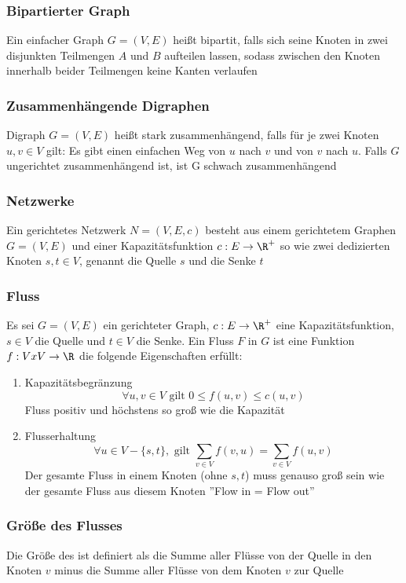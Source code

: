 \documentclass[a4paper]{article}
\begin{document}
	\subsubsection{Bipartierter Graph}
		Ein einfacher Graph $G=(V,E)$ heißt bipartit, falls sich seine Knoten in zwei disjunkten Teilmengen $A$ und $B$ aufteilen lassen, sodass zwischen den Knoten innerhalb beider Teilmengen keine Kanten verlaufen
	\subsubsection{Zusammenhängende Digraphen}
		Digraph $G=(V,E)$ heißt stark zusammenhängend, falls für je zwei Knoten $u,v\in V$ gilt: Es gibt einen einfachen Weg von $u$ nach $v$ und von $v$ nach $u$. Falls $G$ ungerichtet zusammenhängend ist, ist G schwach zusammenhängend
	\subsubsection{Netzwerke}
		Ein gerichtetes Netzwerk $N=(V,E,c)$ besteht aus einem gerichtetem Graphen $G=(V,E)$ und einer Kapazitätsfunktion $c:E\to \R^+$ so wie zwei dedizierten Knoten $s,t\in V$, genannt die Quelle $s$ und die Senke $t$
	\subsubsection{Fluss}
		Es sei $G=(V,E)$ ein gerichteter Graph, $c:E\to \R^+$ eine Kapazitätsfunktion, $s\in V$ die Quelle und $t\in V$ die Senke. Ein Fluss $F$ in $G$ ist eine Funktion $f:VxV\to \R$ die folgende Eigenschaften erfüllt:
			\begin{enumerate}
			  \item Kapazitätsbegränzung 
			  	$$
			  		\forall u,v\in V \text{ gilt } 0\leq f(u,v)\leq c(u,v)
			  	$$
			  	Fluss positiv und höchstens so groß wie die Kapazität
			  	\item Flusserhaltung
			  	$$
			  		\forall u\in V-\{s,t\}, \text{ gilt } \displaystyle\sum_{v \in V}f(v,u)=\displaystyle\sum_{v\in V}f(u,v)
			  	$$
			  	Der gesamte Fluss in einem Knoten (ohne $s,t$) muss genauso groß sein wie der gesamte Fluss aus diesem Knoten ''Flow in = Flow out'' 
			\end{enumerate}
			\subsubsection{Größe des Flusses}
			Die Größe des ist definiert als die Summe aller Flüsse von der Quelle in den Knoten $v$ minus die Summe aller Flüsse von dem Knoten $v$ zur Quelle
\end{document}
